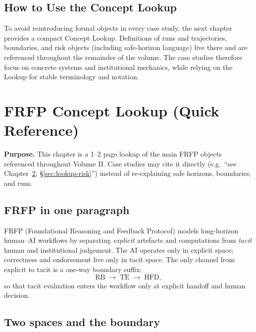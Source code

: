 \section{How to Use the Concept Lookup}

To avoid reintroducing formal objects in every case study, the next chapter provides a compact Concept Lookup. Definitions of runs and trajectories, boundaries, and risk objects (including safe-horizon language) live there and are referenced throughout the remainder of the volume. The case studies therefore focus on concrete systems and institutional mechanics, while relying on the Lookup for stable terminology and notation.


\chapter{FRFP Concept Lookup (Quick Reference)}
\label{ch:frfp-lookup}

\noindent\textbf{Purpose.}
This chapter is a 1--2 page lookup of the main FRFP objects referenced throughout Volume II.
Case studies may cite it directly (e.g.\ ``see Chapter~\ref{ch:frfp-lookup}, \S\ref{sec:lookup-risk}'')
instead of re-explaining safe horizons, boundaries, and runs.

\section{FRFP in one paragraph}
FRFP (Foundational Reasoning and Feedback Protocol) models long-horizon human--AI workflows by
separating \emph{explicit} artefacts and computations from \emph{tacit} human and institutional
judgement. The AI operates only in explicit space; correctness and endorsement live only in tacit
space. The only channel from explicit to tacit is a one-way boundary suffix:
\[
\mathrm{RB} \;\to\; \mathrm{TE} \;\to\; \mathrm{HFD},
\]
so that tacit evaluation enters the workflow only at explicit handoff and human decision.

\section{Two spaces and the boundary}
\label{sec:lookup-spaces}

